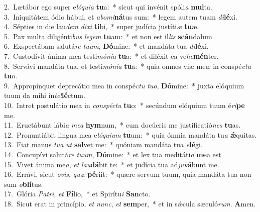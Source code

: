 {2.~}Lætábor ego super e\textit{ló}\textit{qui}\textit{a} \textbf{tu}a:~* sicut qui invénit spóli\textit{a} \textbf{mul}ta.\\
{3.~}Iniquitátem ódio hábui, et \textit{a}\textit{bo}\textit{mi}\textbf{ná}tus sum:~* legem autem tuam \textit{di}\textbf{lé}xi.\\
{4.~}Sépties in die lau\textit{dem} \textit{di}\textit{xi} \textbf{ti}bi,~* super judícia justíti\textit{æ} \textbf{tu}æ.\\
{5.~}Pax multa diligénti\textit{bus} \textit{le}\textit{gem} \textbf{tu}am:~* et non est il\textit{lis} \textbf{scán}dalum.\\
{6.~}Exspectábam salutá\textit{re} \textit{tu}\textit{um}, \textbf{Dó}mine:~* et mandáta tua \textit{di}\textbf{lé}xi.\\
{7.~}Custodívit ánima mea testi\textit{mó}\textit{ni}\textit{a} \textbf{tu}a:~* et diléxit ea ve\textit{he}\textbf{mén}ter.\\
{8.~}Servávi mandáta tua, et testi\textit{mó}\textit{ni}\textit{a} \textbf{tu}a:~* quia omnes viæ meæ in conspé\textit{ctu} \textbf{tu}o.\\
{9.~}Appropínquet deprecátio mea in conspé\textit{ctu} \textit{tu}\textit{o}, \textbf{Dó}mine:~* juxta elóquium tuum da mihi in\textit{tel}\textbf{lé}ctum.\\
{10.~}Intret postulátio mea in \textit{con}\textit{spé}\textit{ctu} \textbf{tu}o:~* secúndum elóquium tuum é\textit{ri}\textbf{pe} me.\\
{11.~}Eructábunt lábi\textit{a} \textit{me}\textit{a} \textbf{hym}num,~* cum docúeris me justificatió\textit{nes} \textbf{tu}as.\\
{12.~}Pronuntiábit lingua mea e\textit{ló}\textit{qui}\textit{um} \textbf{tu}um:~* quia ómnia mandáta tu\textit{a} \textbf{ǽ}quitas.\\
{13.~}Fiat manus \textit{tu}\textit{a} \textit{ut} \textbf{sal}vet me:~* quóniam mandáta tua \textit{e}\textbf{lé}gi.\\
{14.~}Concupívi salutá\textit{re} \textit{tu}\textit{um}, \textbf{Dó}mine:~* et lex tua meditáti\textit{o} \textbf{me}a est.\\
{15.~}Vivet ánima me\textit{a}, \textit{et} \textit{lau}\textbf{dá}bit te:~* et judícia tua ad\textit{ju}\textbf{vá}bunt me.\\
{16.~}Errávi, sicut \textit{o}\textit{vis}, \textit{quæ} \textbf{pé}riit:~* quære servum tuum, quia mandáta tua non sum \textit{o}\textbf{blí}tus.\\
{17.~}Glória \textit{Pa}\textit{tri}, \textit{et} \textbf{Fí}lio,~* et Spirítu\textit{i} \textbf{San}cto.\\
{18.~}Sicut erat in princípio, \textit{et} \textit{nunc}, \textit{et} \textbf{sem}per,~* et in sǽcula sæculó\textit{rum}. \textbf{A}men.\\
